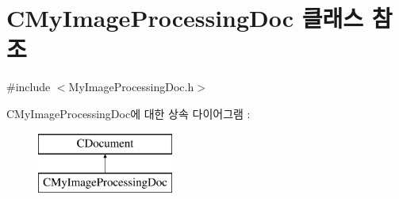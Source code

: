\hypertarget{class_c_my_image_processing_doc}{\section{C\-My\-Image\-Processing\-Doc 클래스 참조}
\label{class_c_my_image_processing_doc}
}


{\ttfamily \#include $<$My\-Image\-Processing\-Doc.\-h$>$}

C\-My\-Image\-Processing\-Doc에 대한 상속 다이어그램 \-: \begin{figure}[H]
\begin{center}
\leavevmode
\includegraphics[height=2.000000cm]{class_c_my_image_processing_doc}
\end{center}
\end{figure}
